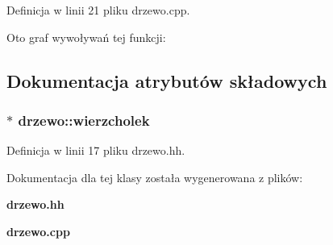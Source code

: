 \-Definicja w linii 21 pliku drzewo.\-cpp.



\-Oto graf wywoływań tej funkcji\-:




\subsection{\-Dokumentacja atrybutów składowych}
\subsubsection[{wierzcholek}]{$\ast$ {\bf drzewo\-::wierzcholek}}\label{classdrzewo_ac1de799651c5174c8009025cfe2a83b1}


\-Definicja w linii 17 pliku drzewo.\-hh.



\-Dokumentacja dla tej klasy została wygenerowana z plików\-:\begin{DoxyCompactItemize}
\item 
{\bf drzewo.\-hh}\item 
{\bf drzewo.\-cpp}\end{DoxyCompactItemize}
